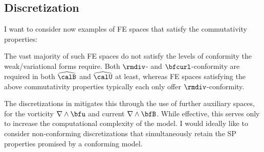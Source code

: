 \subsection*{Discretization}
    \begin{remark}
        I want to consider now examples of FE spaces that satisfy the commutativity properties:
        \begin{center}\end{center}
        The vast majority of such FE spaces do not satisfy the levels of conformity the weak/variational forms require. Both $\rmdiv$- and $\bfcurl$-conformity are required in both $\widehat{\calB}$ and $\widehat{\calU}$ at least, whereas FE spaces satisfying the above commutativity properties typically each only offer $\rmdiv$-conformity.
        
        The discretizations in \cite{Laakmann_Hu_Farrell_2022} mitigates this through the use of further auxiliary spaces, for the vorticity $\nabla\wedge\bfu$ and current $\nabla\wedge\bfB$. While effective, this serves only to increase the computational complexity of the model. I would ideally like to consider non-conforming discretizations that simultaneously retain the SP properties promised by a conforming model.


\end{remark}
